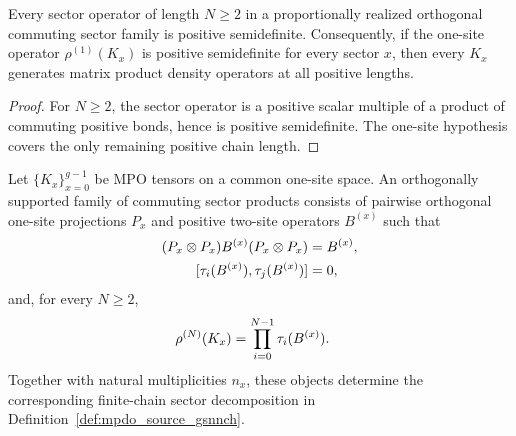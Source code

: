 \begin{lemma}
    \label{thm:mpdo_proportional_commuting_sector_positivity}
    \leanok
    Every sector operator of length $N\geq2$ in a proportionally realized
    orthogonal commuting sector family is positive semidefinite. Consequently,
    if the one-site operator $\rho^{(1)}(K_x)$ is positive semidefinite for
    every sector $x$, then every $K_x$ generates matrix product density
    operators at all positive lengths.
\end{lemma}

\begin{proof}\leanok
    For $N\geq2$, the sector operator is a positive scalar multiple of a
    product of commuting positive bonds, hence is positive semidefinite. The
    one-site hypothesis covers the only remaining positive chain length.
\end{proof}

\begin{definition}
    \label{def:mpdo_orthogonal_commuting_sector_family}
    \leanok
    Let $\{K_x\}_{x=0}^{g-1}$ be MPO tensors on a common one-site space.
    An orthogonally supported family of commuting sector products consists of
    pairwise orthogonal one-site projections $P_x$ and positive two-site
    operators $B^{(x)}$ such that
    \begin{align}
        (P_x\otimes P_x)B^{(x)}(P_x\otimes P_x)
         & =B^{(x)},
        \notag       \\
        [\tau_i(B^{(x)}),\tau_j(B^{(x)})]
         & =0,
        \notag
    \end{align}
    and, for every $N\geq2$,
    \begin{align}
        \rho^{(N)}(K_x)
         & =\prod_{i=0}^{N-1}\tau_i(B^{(x)}).
        \notag
    \end{align}
    Together with natural multiplicities $n_x$, these objects determine the
    corresponding finite-chain sector decomposition in
    Definition~\ref{def:mpdo_source_gsnnch}.
\end{definition}

